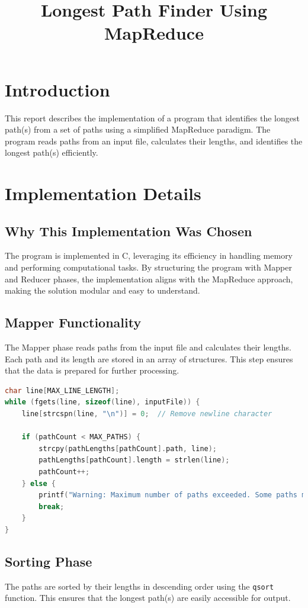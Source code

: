\documentclass[12pt]{article}
\title{Longest Path Finder Using MapReduce}
\author{}
\date{}
\begin{document}
\maketitle

\section*{Introduction}
This report describes the implementation of a program that identifies the longest path(s) from a set of paths using a simplified MapReduce paradigm. The program reads paths from an input file, calculates their lengths, and identifies the longest path(s) efficiently.

\section*{Implementation Details}

\subsection*{Why This Implementation Was Chosen}
The program is implemented in C, leveraging its efficiency in handling memory and performing computational tasks. By structuring the program with Mapper and Reducer phases, the implementation aligns with the MapReduce approach, making the solution modular and easy to understand.

\subsection*{Mapper Functionality}
The Mapper phase reads paths from the input file and calculates their lengths. Each path and its length are stored in an array of structures. This step ensures that the data is prepared for further processing.

\begin{lstlisting}[language=C, caption=Mapper Phase]
char line[MAX_LINE_LENGTH];
while (fgets(line, sizeof(line), inputFile)) {
    line[strcspn(line, "\n")] = 0;  // Remove newline character

    if (pathCount < MAX_PATHS) {
        strcpy(pathLengths[pathCount].path, line);
        pathLengths[pathCount].length = strlen(line);
        pathCount++;
    } else {
        printf("Warning: Maximum number of paths exceeded. Some paths may be skipped.\n");
        break;
    }
}
\end{lstlisting}

\subsection*{Sorting Phase}
The paths are sorted by their lengths in descending order using the \texttt{qsort} function. This ensures that the longest path(s) are easily accessible for output.
\end{document}
